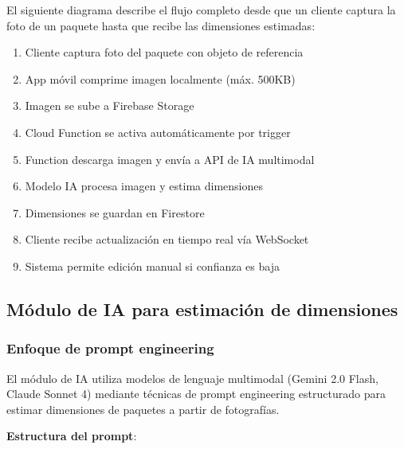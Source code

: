 El siguiente diagrama describe el flujo completo desde que un cliente captura la foto de un paquete hasta que recibe las dimensiones estimadas:

\begin{enumerate}
    \item Cliente captura foto del paquete con objeto de referencia
    \item App móvil comprime imagen localmente (máx. 500KB)
    \item Imagen se sube a Firebase Storage
    \item Cloud Function se activa automáticamente por trigger
    \item Function descarga imagen y envía a API de IA multimodal
    \item Modelo IA procesa imagen y estima dimensiones
    \item Dimensiones se guardan en Firestore
    \item Cliente recibe actualización en tiempo real vía WebSocket
    \item Sistema permite edición manual si confianza es baja
\end{enumerate}

\subsection{Módulo de IA para estimación de dimensiones}

\subsubsection{Enfoque de prompt engineering}

El módulo de IA utiliza modelos de lenguaje multimodal (Gemini 2.0 Flash, Claude Sonnet 4) mediante técnicas de prompt engineering estructurado para estimar dimensiones de paquetes a partir de fotografías.

\textbf{Estructura del prompt}:

